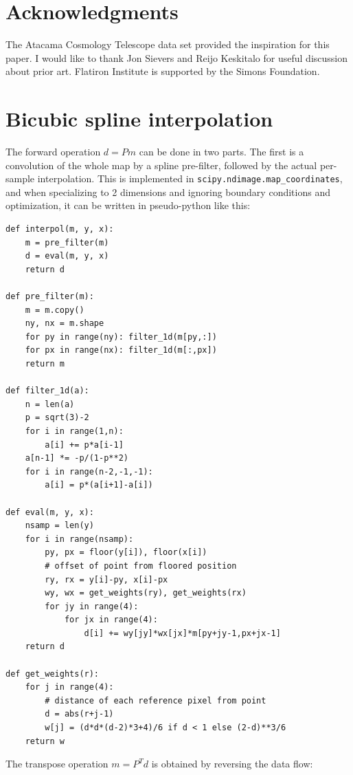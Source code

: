 \documentclass{article}
\newcommand{\code}[1]{\texttt{#1}}
\begin{document}
\section*{Acknowledgments}
The Atacama Cosmology Telescope data set provided the inspiration for this
paper. I would like to thank Jon Sievers and Reijo Keskitalo for useful discussion
about prior art. Flatiron Institute is supported by the Simons Foundation.




\pagebreak

\appendix

\section{Bicubic spline interpolation}
The forward operation $d=Pm$ can be done in two parts. The first
is a convolution of the whole map by a spline pre-filter, followed by the
actual per-sample interpolation. This is implemented in \code{scipy.ndimage.map\_coordinates},
and when specializing to 2 dimensions and ignoring boundary conditions and optimization,
it can be written in pseudo-python like this:
\begin{lstlisting}
def interpol(m, y, x):
	m = pre_filter(m)
	d = eval(m, y, x)
	return d

def pre_filter(m):
	m = m.copy()
	ny, nx = m.shape
	for py in range(ny): filter_1d(m[py,:])
	for px in range(nx): filter_1d(m[:,px])
	return m

def filter_1d(a):
	n = len(a)
	p = sqrt(3)-2
	for i in range(1,n):
		a[i] += p*a[i-1]
	a[n-1] *= -p/(1-p**2)
	for i in range(n-2,-1,-1):
		a[i] = p*(a[i+1]-a[i])

def eval(m, y, x):
	nsamp = len(y)
	for i in range(nsamp):
		py, px = floor(y[i]), floor(x[i])
		# offset of point from floored position
		ry, rx = y[i]-py, x[i]-px
		wy, wx = get_weights(ry), get_weights(rx)
		for jy in range(4):
			for jx in range(4):
				d[i] += wy[jy]*wx[jx]*m[py+jy-1,px+jx-1]
	return d

def get_weights(r):
	for j in range(4):
		# distance of each reference pixel from point
		d = abs(r+j-1)
		w[j] = (d*d*(d-2)*3+4)/6 if d < 1 else (2-d)**3/6
	return w
\end{lstlisting}
The transpose operation $m = P^T d$ is obtained by reversing the data flow:
\end{document}
